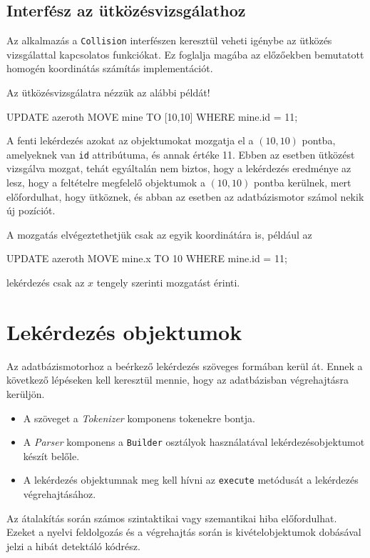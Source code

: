 \subsection{Interfész az ütközésvizsgálathoz}

Az alkalmazás a \texttt{Collision} interfészen keresztül veheti igénybe az ütközés vizsgálattal kapcsolatos funkciókat. Ez foglalja magába az előzőekben bemutatott homogén koordinátás számítás implementációt.

Az ütközésvizsgálatra nézzük az alábbi példát!
\begin{sql}
UPDATE azeroth MOVE mine TO [10,10] WHERE mine.id = 11; 
\end{sql}
A fenti lekérdezés azokat az objektumokat mozgatja el a $(10, 10)$ pontba, amelyeknek van \texttt{id} attribútuma, és annak értéke 11. Ebben az esetben ütközést vizsgálva mozgat, tehát egyáltalán nem biztos, hogy a lekérdezés eredménye az lesz, hogy a feltételre megfelelő objektumok a $(10, 10)$ pontba kerülnek, mert előfordulhat, hogy ütköznek, és abban az esetben az adatbázismotor számol nekik új pozíciót.

A mozgatás elvégeztethetjük csak az egyik koordinátára is, például az
\begin{sql}
UPDATE azeroth MOVE mine.x TO 10 WHERE mine.id = 11;
\end{sql}
lekérdezés csak az $x$ tengely szerinti mozgatást érinti.

\section{Lekérdezés objektumok}

Az adatbázismotorhoz a beérkező lekérdezés szöveges formában kerül át. Ennek a következő lépéseken kell keresztül mennie, hogy az adatbázisban végrehajtásra kerüljön.
\begin{itemize}
\item A szöveget a \textit{Tokenizer} komponens tokenekre bontja.
\item A \textit{Parser} komponens a \texttt{Builder} osztályok használatával lekérdezésobjektumot készít belőle.
\item A lekérdezés objektumnak meg kell hívni az \texttt{execute} metódusát a lekérdezés végrehajtásához.
\end{itemize}

Az átalakítás során számos szintaktikai vagy szemantikai hiba előfordulhat. Ezeket a nyelvi feldolgozás és a végrehajtás során is kivételobjektumok dobásával jelzi a hibát detektáló kódrész.

